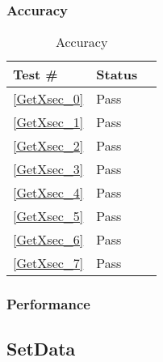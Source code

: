\documentclass[12pt]{article}
\begin{document}
	\subsubsection{Accuracy}
		\begin{table}[H]
		\centering
		\caption{Accuracy}\label{GetY_acc}
		\begin{tabular}{lll}
		\toprule
		\bf Test \# & Status \\\midrule
		\ref{GetXsec_0} & Pass\\
		\ref{GetXsec_1} & Pass\\
		\ref{GetXsec_2} & Pass\\
		\ref{GetXsec_3} & Pass\\
		\ref{GetXsec_4} & Pass\\
		\ref{GetXsec_5} & Pass\\
		\ref{GetXsec_6} & Pass\\
		\ref{GetXsec_7} & Pass\\
		\bottomrule
		\end{tabular}
		\end{table}
	\subsubsection{Performance}

\subsection{SetData} %
\end{document}
